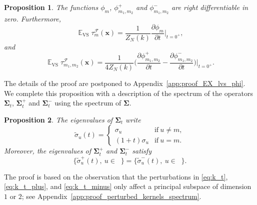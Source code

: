 \documentclass[twoside,11pt]{book}
\newtheorem{proposition}{Proposition}
\DeclareMathOperator{\VS}{\mathrm{VS}}
\DeclareMathOperator{\EX}{\mathbb{E}}
\DeclareMathOperator{\F}{\mathcal{F}}
\DeclareMathOperator{\Ns}{\mathbb{N}^{*}}
\begin{document}
\begin{proposition}\label{thm:EX_lvs_phi}
The functions $\phi_m$, $\phi_{m_1,m_2}^{+}$ and $\phi_{m_1,m_2}^{-}$ are right differentiable in zero. Furthermore,
\begin{equation}\label{eq:EX_lvs_n_delta_phi_n}
\EX_{\VS} \tau_{m}^{\F}(\bm{x})  = \frac{1}{Z_{N}(k)}  \frac{\partial \phi_{m}}{ \partial t }\bigg|_{t = 0^{+}},
\end{equation}
and
\begin{equation}\label{eq:EX_VS_cross_lvs_formula}
\EX_{\VS} \tau_{m_{1},m_{2}}^{\F}(\bm{x}) = \frac{1}{4Z_{N}(k)} \bigg(\frac{\partial \phi_{m_{1},m_{2}}^{+}}{ \partial t } - \frac{\partial \phi_{m_{1},m_{2}}^{-}}{ \partial t }\bigg)\bigg|_{t = 0^{+}}.
\end{equation}
\end{proposition}
 The details of the proof are postponed to Appendix~\ref{app:proof_EX_lvs_phi}. We complete this proposition with a description of the spectrum of the operators $\bm{\Sigma}_{t}$, $\bm{\Sigma}_{t}^{+}$ and $\bm{\Sigma}_{t}^{-}$ using the spectrum of $\bm{\Sigma}$.
\begin{proposition}\label{prop:perturbed_kernels_spectrum}
The eigenvalues of $\bm{\Sigma}_{t}$ write
\begin{equation}
\tilde{\sigma}_{u}(t) =  \left\{
    \begin{array}{ll}
        \sigma_{u} & \mbox{if} \: u \neq m, \\
        (1 + t)\sigma_{u} & \mbox{if}\: u = m.
    \end{array}
\right.
\end{equation}
Moreover, the eigenvalues of $\bm{\Sigma}_{t}^{+}$ and $\bm{\Sigma}_{t}^{-}$ satisfy
\begin{equation}\label{eq:equality_positive_negative_spectrum}
\{\tilde{\sigma}_{u}^{+}(t), \: u \in \Ns \} = \{\tilde{\sigma}_{u}^{-}(t), \: u \in \Ns \}.
\end{equation}
\end{proposition}
The proof is based on the observation that the perturbations in \eqref{eq:k_t}, \eqref{eq:k_t_plus}, and \eqref{eq:k_t_minus} only affect a principal subspace of dimension $1$ or $2$; see Appendix~\ref{app:proof_perturbed_kernels_spectrum}.
\end{document}
